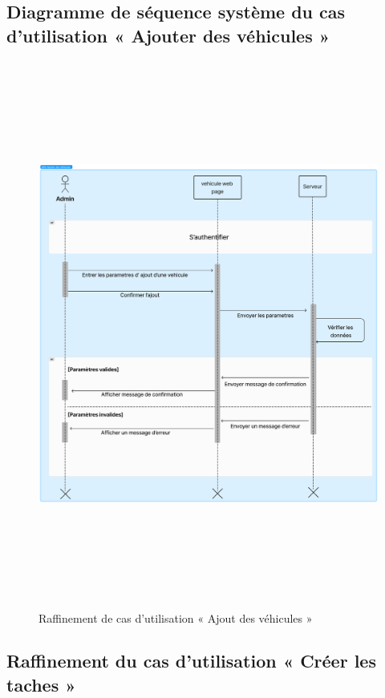 \subsection{Diagramme de séquence système du cas d’utilisation « Ajouter des véhicules »}
\begin{figure}[h!]
  \centering
  \includegraphics[width=1\textwidth,height=18cm]{chap4.images/dss ajouter vehicule.png}
  \caption{Raffinement de cas d’utilisation « Ajout des véhicules »}

\end{figure}


\newpage
\subsection{Raffinement du cas d'utilisation « Créer les taches »}

